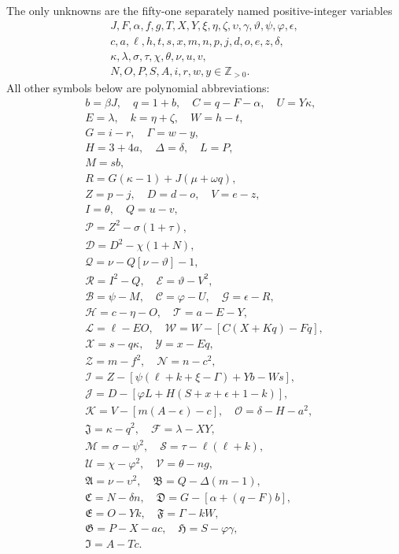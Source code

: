 The only unknowns are the fifty-one separately named positive-integer variables
\[
\begin{gathered}J,F,\alpha,f,g,T,X,Y,\xi,\eta,\zeta,\upsilon,\gamma,\vartheta,\psi,\varphi,\epsilon,\\
c,a,\ell,h,t,s,x,m,n,p,j,d,o,e,z,\delta,\\
\kappa,\lambda,\sigma,\tau,\chi,\theta,\nu,u,v,\\
N,O,P,S,A,i,r,w,y\in\mathbb Z_{>0}.\end{gathered}
\]
All other symbols below are polynomial abbreviations:
\[
\begin{gathered}
b=\beta J,\quad q=1+b,\quad C=q-F-\alpha,\quad U=Y\kappa,\\
E=\lambda,\quad k=\eta+\zeta,\quad W=h-t,\\
G=i-r,\quad\Gamma=w-y,\\
H=3+4a,\quad\Delta=\delta,\quad L=P,\\
M=sb,\\
R=G(\kappa-1)+J(\mu+\omega q),\\
Z=p-j,\quad D=d-o,\quad V=e-z,\\
I=\theta,\quad Q=u-v,\\
\mathcal{P}=Z^2-\sigma(1+\tau),\\
\mathcal{D}=D^2-\chi(1+N),\\
\mathcal{Q}=\nu-Q[\nu-\vartheta]-1,\\
\mathcal{R}=I^2-Q,\quad \mathcal{E}=\vartheta-V^2,\\
\mathcal{B}=\psi-M,\quad \mathcal{C}=\varphi-U,\quad \mathcal{G}=\epsilon-R,\\
\mathcal{H}=c-\eta-O,\quad \mathcal{T}=a-E-Y,\\
\mathcal{L}=\ell-EO,\quad \mathcal{W}=W-[C(X+Kq)-Fq],\\
\mathcal{X}=s-q\kappa,\quad \mathcal{Y}=x-Eq,\\
\mathcal{Z}=m-f^2,\quad \mathcal{N}=n-c^2,\\
\mathcal{I}=Z-[\psi(\ell+k+\xi-\Gamma)+Yb-Ws],\\
\mathcal{J}=D-[\varphi L+H(S+x+\epsilon+1-k)],\\
\mathcal{K}=V-[m(A-\epsilon)-c],\quad\mathcal{O}=\delta-H-a^2,\\
\mathfrak{J}=\kappa-q^2,\quad\mathcal{F}=\lambda-XY,\\
\mathcal{M}=\sigma-\psi^2,\quad\mathcal{S}=\tau-\ell(\ell+k),\\
\mathcal{U}=\chi-\varphi^2,\quad\mathcal{V}=\theta-ng,\\
\mathfrak{A}=\nu-\upsilon^2,\quad\mathfrak{B}=Q-\Delta(m-1),\\
\mathfrak{C}=N-\delta n,\quad\mathfrak{D}=G-[\alpha+(q-F)b],\\
\mathfrak{E}=O-Yk,\quad\mathfrak{F}=\Gamma-kW,\\
\mathfrak{G}=P-X-ac,\quad\mathfrak{H}=S-\varphi\gamma,\\
\mathfrak{I}=A-Tc.
\end{gathered}
\]
